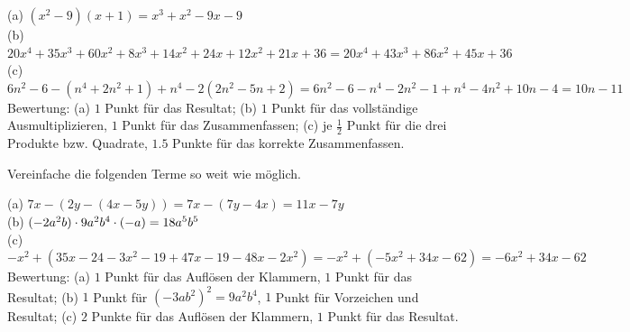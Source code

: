 \documentclass[11pt]{exam}
\begin{document}
\begin{questions}
{\begin{solution}
	(a) $(x^2-9)(x+1)=x^3+x^2-9x-9$\\
	(b) $20x^4+35x^3+60x^2+8x^3+14x^2+24x+12x^2+21x+36=20x^4+43x^3+86x^2+45x+36$\\
	(c) $6n^2-6-(n^4+2n^2+1)+n^4-2(2n^2-5n+2)=6n^2-6-n^4-2n^2-1+n^4-4n^2+10n-4=10n-11$\\
	Bewertung: (a) $1$ Punkt für das Resultat; (b) $1$ Punkt für das vollständige Ausmultiplizieren, $1$ Punkt für das Zusammenfassen; (c) je $\frac{1}{2}$ Punkt für die drei Produkte bzw. Quadrate, $1.5$ Punkte für das korrekte Zusammenfassen.
\end{solution}}
{}


\noaddpoints
\question[\totalpoints] %
\addpoints
Vereinfache die folgenden Terme so weit wie möglich.
{\begin{solution}
	(a) $7x-(2y-(4x-5y))=7x-(7y-4x)=11x-7y$\\
	(b) $(-2a^2b)\cdot9a^2b^4\cdot(-a)=18a^5b^5$\\
	(c) $-x^2+(35x-24-3x^2-19+47x-19-48x-2x^2)=-x^2+(-5x^2+34x-62)=-6x^2+34x-62$\\
	Bewertung: (a) $1$ Punkt für das Auflösen der Klammern, $1$ Punkt für das Resultat; (b) $1$ Punkt für $(-3ab^2)^2=9a^2b^4$, $1$ Punkt für Vorzeichen und Resultat; (c) $2$ Punkte für das Auflösen der Klammern, $1$ Punkt für das Resultat.
\end{solution}}
{}


\end{questions}
\end{document}
